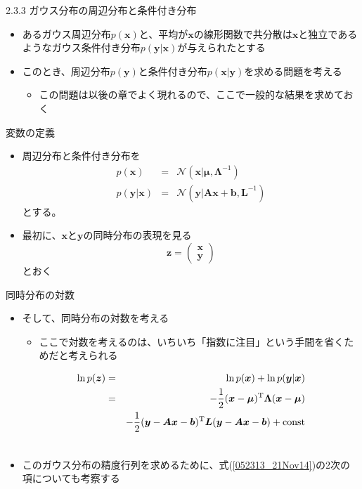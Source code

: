 \begin{frame}{2.3.3 ガウス分布の周辺分布と条件付き分布}
 \begin{itemize}
  \item あるガウス周辺分布$p(\bm{x})$と、平均が$\bm{x}$の線形関数で共分散は$\bm{x}$と独立であるようなガウス条件付き分布$p(\bm{y}|\bm{x})$が与えられたとする
  \item このとき、周辺分布$p(\bm{y})$と条件付き分布$p(\bm{x}|\bm{y})$を求める問題を考える
        \begin{itemize}
         \item この問題は以後の章でよく現れるので、ここで一般的な結果を求めておく
        \end{itemize}
 \end{itemize}
\end{frame}

\begin{frame}{変数の定義}
 \begin{itemize}
  \item 周辺分布と条件付き分布を
        \begin{eqnarray}
         p(\bm{x}) &=& \mathcal{N}(\bm{x}|\bm{\mu} , \bm{\Lambda}^{-1})\\
         p(\bm{y}|\bm{x}) &=& \mathcal{N}(\bm{y}|\bm{A}\bm{x}+\bm{b}, \bm{L}^{-1})
        \end{eqnarray}
        とする。
  \item 最初に、$\bm{x}$と$\bm{y}$の同時分布の表現を見る
        \begin{equation}
         \bm{z} = \begin{pmatrix}
              \bm{x} \\
              \bm{y}
             \end{pmatrix}
        \end{equation}
        とおく
 \end{itemize}
\end{frame}

\begin{frame}{同時分布の対数}
 \begin{itemize}
  \item そして、同時分布の対数を考える
  \begin{itemize}
   \item ここで対数を考えるのは、いちいち「指数に注目」という手間を省くためだと考えられる
  \end{itemize}
        \begin{eqnarray}
         \ln p(\bm{z}) &=& \ln p(\bm{x}) + \ln p(\bm{y}|\bm{x}) \nonumber \\
         &= & -\frac{1}{2}(\bm{x}-\bm{\mu})^{\mathrm{T}}\bm{\Lambda}(\bm{x}-\bm{\mu}) \nonumber \\
         &&-\frac{1}{2}(\bm{y}-\bm{A}\bm{x}-\bm{b})^{\mathrm{T}}\bm{L}(\bm{y}-\bm{A}\bm{x}-\bm{b})+{\rm const} \nonumber\\
				 & & \label{052313_21Nov14}
        \end{eqnarray}
  \item このガウス分布の精度行列を求めるために、式(\ref{052313_21Nov14})の2次の項についても考察する
 \end{itemize}
\end{frame}

